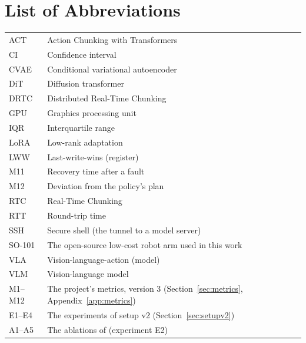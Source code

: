 \chapter*{List of Abbreviations}
\thispagestyle{plain}

\begin{tabular}{@{}p{}p{}@{}}
ACT & Action Chunking with Transformers \\
CI & Confidence interval \\
CVAE & Conditional variational autoencoder \\
DiT & Diffusion transformer \\
DRTC & Distributed Real-Time Chunking \\
GPU & Graphics processing unit \\
IQR & Interquartile range \\
LoRA & Low-rank adaptation \\
LWW & Last-write-wins (register) \\
M11 & Recovery time after a fault \\
M12 & Deviation from the policy's plan \\
RTC & Real-Time Chunking \\
RTT & Round-trip time \\
SSH & Secure shell (the tunnel to a model server) \\
SO-101 & The open-source low-cost robot arm used in this work \\
VLA & Vision-language-action (model) \\
VLM & Vision-language model \\
M1--M12 & The project's metrics, version 3 (Section~\ref{sec:metrics}, Appendix~\ref{app:metrics}) \\
E1--E4 & The experiments of setup v2 (Section~\ref{sec:setupv2}) \\
A1--A5 & The ablations of \drtc{} (experiment E2) \\
\end{tabular}

